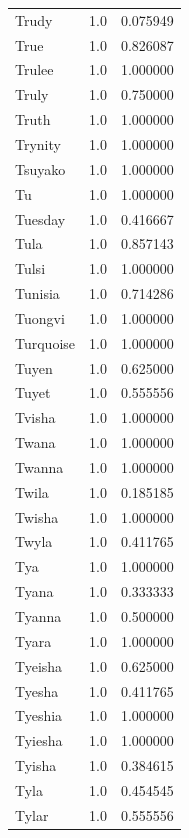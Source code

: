 \documentclass[
  letterpaper,
  DIV=11,
  numbers=noendperiod]{scrreprt}
\begin{document}
\begin{tabular}{lrr}
Trudy           &   1.0 &   0.075949 \\
True            &   1.0 &   0.826087 \\
Trulee          &   1.0 &   1.000000 \\
Truly           &   1.0 &   0.750000 \\
Truth           &   1.0 &   1.000000 \\
Trynity         &   1.0 &   1.000000 \\
Tsuyako         &   1.0 &   1.000000 \\
Tu              &   1.0 &   1.000000 \\
Tuesday         &   1.0 &   0.416667 \\
Tula            &   1.0 &   0.857143 \\
Tulsi           &   1.0 &   1.000000 \\
Tunisia         &   1.0 &   0.714286 \\
Tuongvi         &   1.0 &   1.000000 \\
Turquoise       &   1.0 &   1.000000 \\
Tuyen           &   1.0 &   0.625000 \\
Tuyet           &   1.0 &   0.555556 \\
Tvisha          &   1.0 &   1.000000 \\
Twana           &   1.0 &   1.000000 \\
Twanna          &   1.0 &   1.000000 \\
Twila           &   1.0 &   0.185185 \\
Twisha          &   1.0 &   1.000000 \\
Twyla           &   1.0 &   0.411765 \\
Tya             &   1.0 &   1.000000 \\
Tyana           &   1.0 &   0.333333 \\
Tyanna          &   1.0 &   0.500000 \\
Tyara           &   1.0 &   1.000000 \\
Tyeisha         &   1.0 &   0.625000 \\
Tyesha          &   1.0 &   0.411765 \\
Tyeshia         &   1.0 &   1.000000 \\
Tyiesha         &   1.0 &   1.000000 \\
Tyisha          &   1.0 &   0.384615 \\
Tyla            &   1.0 &   0.454545 \\
Tylar           &   1.0 &   0.555556 \\

\end{tabular}
\end{document}
